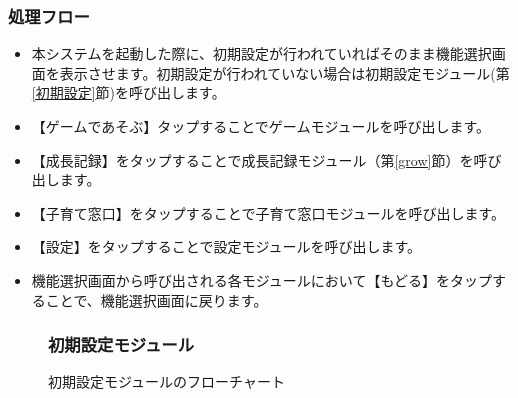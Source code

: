 \documentclass[a4j]{jarticle}
\begin{document}
\subsubsection*{処理フロー}
\begin{itemize}
\item 本システムを起動した際に、初期設定が行われていればそのまま機能選択画面を表示させます。初期設定が行われていない場合は初期設定モジュール(第\ref{初期設定}節)を呼び出します。

\item 【ゲームであそぶ】タップすることでゲームモジュールを呼び出します。

\item 【成長記録】をタップすることで成長記録モジュール（第\ref{grow}節）を呼び出します。

\item 【子育て窓口】をタップすることで子育て窓口モジュールを呼び出します。

\item 【設定】をタップすることで設定モジュールを呼び出します。

\item 機能選択画面から呼び出される各モジュールにおいて【もどる】をタップすることで、機能選択画面に戻ります。
\end{itemize}

\begin{figure}[H]
\subsubsection{初期設定モジュール\label{初期設定}}
    \begin{center}
    \caption {初期設定モジュールのフローチャート}
    \label{initialsetting}
    \end{center}
\end{figure}
\end{document}
